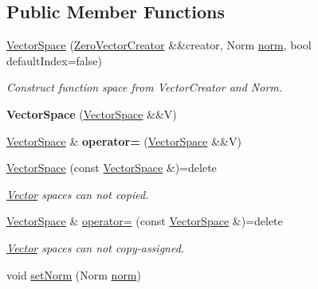 \subsection*{Public Member Functions}
\begin{DoxyCompactItemize}
\item 
\hyperlink{classSpacy_1_1VectorSpace_aa4f30986a1b977cf7f0abc27e0c9872d}{Vector\-Space} (\hyperlink{classSpacy_1_1ZeroVectorCreator}{Zero\-Vector\-Creator} \&\&creator, Norm \hyperlink{classSpacy_1_1VectorSpace_a2f26e33994544a37a83e6938a748ab8c}{norm}, bool default\-Index=false)
\begin{DoxyCompactList}\small\item\em Construct function space from Vector\-Creator and Norm. \end{DoxyCompactList}\item 
\hypertarget{classSpacy_1_1VectorSpace_a2bc6444dc35de9fe68d7a8156c03125f}{{\bfseries Vector\-Space} (\hyperlink{classSpacy_1_1VectorSpace}{Vector\-Space} \&\&V)}\label{classSpacy_1_1VectorSpace_a2bc6444dc35de9fe68d7a8156c03125f}

\item 
\hypertarget{classSpacy_1_1VectorSpace_a5c43f6cca9f16ee3839e813633f87370}{\hyperlink{classSpacy_1_1VectorSpace}{Vector\-Space} \& {\bfseries operator=} (\hyperlink{classSpacy_1_1VectorSpace}{Vector\-Space} \&\&V)}\label{classSpacy_1_1VectorSpace_a5c43f6cca9f16ee3839e813633f87370}

\item 
\hypertarget{classSpacy_1_1VectorSpace_ae8f3f22a43fcc418c447b5f49568d54e}{\hyperlink{classSpacy_1_1VectorSpace_ae8f3f22a43fcc418c447b5f49568d54e}{Vector\-Space} (const \hyperlink{classSpacy_1_1VectorSpace}{Vector\-Space} \&)=delete}\label{classSpacy_1_1VectorSpace_ae8f3f22a43fcc418c447b5f49568d54e}

\begin{DoxyCompactList}\small\item\em \hyperlink{classSpacy_1_1Vector}{Vector} spaces can not copied. \end{DoxyCompactList}\item 
\hypertarget{classSpacy_1_1VectorSpace_a30d39a339ed924a6c17c85d75f64afc4}{\hyperlink{classSpacy_1_1VectorSpace}{Vector\-Space} \& \hyperlink{classSpacy_1_1VectorSpace_a30d39a339ed924a6c17c85d75f64afc4}{operator=} (const \hyperlink{classSpacy_1_1VectorSpace}{Vector\-Space} \&)=delete}\label{classSpacy_1_1VectorSpace_a30d39a339ed924a6c17c85d75f64afc4}

\begin{DoxyCompactList}\small\item\em \hyperlink{classSpacy_1_1Vector}{Vector} spaces can not copy-\/assigned. \end{DoxyCompactList}\item 
\hypertarget{classSpacy_1_1VectorSpace_acbd69a540d3c81606751237a94783754}{void \hyperlink{classSpacy_1_1VectorSpace_acbd69a540d3c81606751237a94783754}{set\-Norm} (Norm \hyperlink{classSpacy_1_1VectorSpace_a2f26e33994544a37a83e6938a748ab8c}{norm})}\label{classSpacy_1_1VectorSpace_acbd69a540d3c81606751237a94783754}


\end{DoxyCompactItemize}
